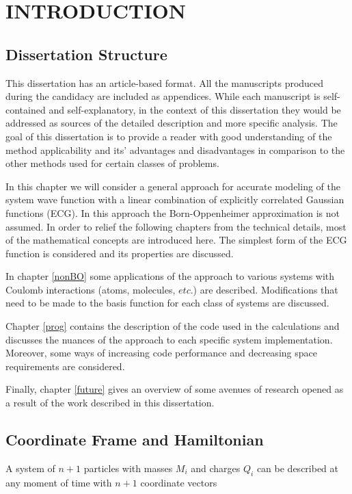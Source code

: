 \chapter{INTRODUCTION\label{chap1}}

\section{Dissertation Structure}

This dissertation has an article-based format. All the manuscripts produced
during the candidacy are included as appendices. While each manuscript is 
self-contained and self-explanatory, in the context of this dissertation
they would be addressed as sources of the detailed description and more
specific analysis. The goal of this dissertation is to provide a reader 
with good understanding of the method applicability and its' advantages
and disadvantages in comparison to the other methods used for certain
classes of problems. 

In this chapter we will consider a general approach for accurate modeling
of the system wave function with a linear combination of explicitly 
correlated Gaussian functions (ECG).
In this approach the Born-Oppenheimer approximation is not assumed.
In order to relief the following 
chapters from the technical details, most of the mathematical concepts
are introduced here. The simplest form of the ECG function is considered
and its properties are discussed. 

In chapter \ref{nonBO} some applications of the approach to 
various systems with Coulomb interactions (atoms, molecules, $etc.$)
are described.
Modifications that need to be made to the basis function for each class
of systems are discussed.

Chapter \ref{prog} contains the description of the code used in the calculations
and discusses the nuances of the approach to each specific system implementation.
Moreover, some ways of increasing code performance and decreasing space 
requirements are considered.

Finally, chapter \ref{future} gives an overview of some avenues of research 
opened as a result of the work described in this dissertation.

\section{Coordinate Frame and Hamiltonian}

A system of $n+1$ particles with masses $M_i$ and charges $Q_i$ can be
described at any moment of time with $n+1$ coordinate vectors  

